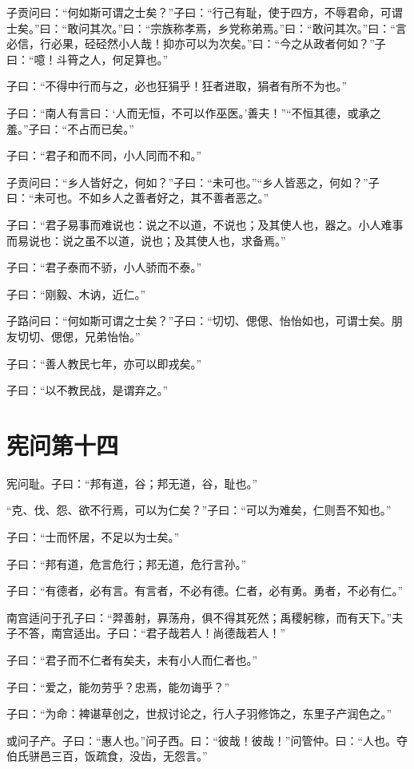 \documentclass[twoside,openany]{book}
\begin{document}
子贡问曰：“何如斯可谓之士矣？”子曰：“行己有耻，使于四方，不辱君命，可谓士矣。”曰：“敢问其次。”曰：“宗族称孝焉，乡党称弟焉。”曰：“敢问其次。”曰：“言必信，行必果，硁硁然小人哉！抑亦可以为次矣。”曰：“今之从政者何如？”子曰：“噫！斗筲之人，何足算也。”

子曰：“不得中行而与之，必也狂狷乎！狂者进取，狷者有所不为也。”

子曰：“南人有言曰：‘人而无恒，不可以作巫医。’善夫！”“不恒其德，或承之羞。”子曰：“不占而已矣。”

子曰：“君子和而不同，小人同而不和。”

子贡问曰：“乡人皆好之，何如？”子曰：“未可也。”“乡人皆恶之，何如？”子曰：“未可也。不如乡人之善者好之，其不善者恶之。”

子曰：“君子易事而难说也：说之不以道，不说也；及其使人也，器之。小人难事而易说也：说之虽不以道，说也；及其使人也，求备焉。”

子曰：“君子泰而不骄，小人骄而不泰。”

子曰：“刚毅、木讷，近仁。”

子路问曰：“何如斯可谓之士矣？”子曰：“切切、偲偲、怡怡如也，可谓士矣。朋友切切、偲偲，兄弟怡怡。”

子曰：“善人教民七年，亦可以即戎矣。”

子曰：“以不教民战，是谓弃之。” 

\chapter{宪问第十四}\label{ch14}

宪问耻。子曰：“邦有道，谷；邦无道，谷，耻也。”

“克、伐、怨、欲不行焉，可以为仁矣？”子曰：“可以为难矣，仁则吾不知也。”

子曰：“士而怀居，不足以为士矣。”

子曰：“邦有道，危言危行；邦无道，危行言孙。”

子曰：“有德者，必有言。有言者，不必有德。仁者，必有勇。勇者，不必有仁。”

南宫适问于孔子曰：“羿善射，奡荡舟，俱不得其死然；禹稷躬稼，而有天下。”夫子不答，南宫适出。子曰：“君子哉若人！尚德哉若人！”

子曰：“君子而不仁者有矣夫，未有小人而仁者也。”

子曰：“爱之，能勿劳乎？忠焉，能勿诲乎？”

子曰：“为命：裨谌草创之，世叔讨论之，行人子羽修饰之，东里子产润色之。”

或问子产。子曰：“惠人也。”问子西。曰：“彼哉！彼哉！”问管仲。曰：“人也。夺伯氏骈邑三百，饭疏食，没齿，无怨言。”
\end{document}
